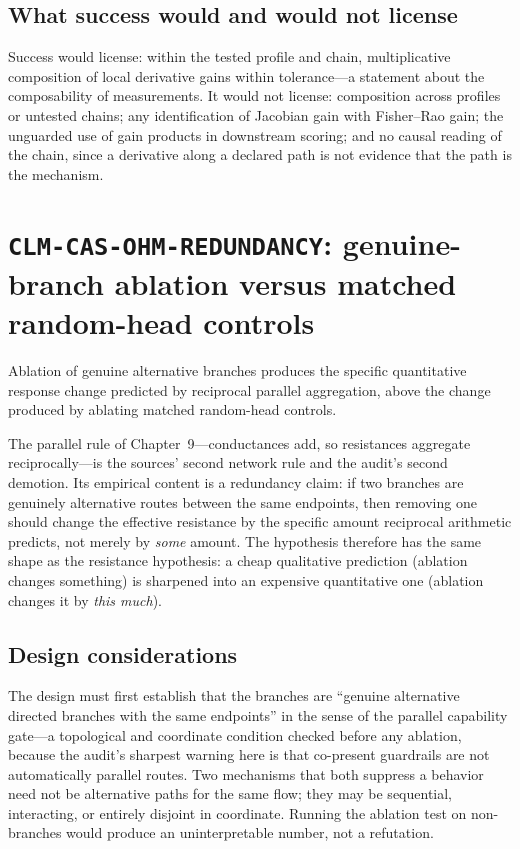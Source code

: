 \subsection{What success would and would not license}

Success would license: within the tested profile and chain, multiplicative composition of local derivative gains within tolerance---a statement about the composability of measurements. It would not license: composition across profiles or untested chains; any identification of Jacobian gain with Fisher--Rao gain; the unguarded use of gain products in downstream scoring; and no causal reading of the chain, since a derivative along a declared path is not evidence that the path is the mechanism.

\section{\texttt{CLM-CAS-OHM-REDUNDANCY}: genuine-branch ablation versus matched random-head controls}\label{hyp:sec:redundancy}

\begin{hypothesis}\label{hyp:hyp:redundancy}
Ablation of genuine alternative branches produces the specific quantitative response change predicted by reciprocal parallel aggregation, above the change produced by ablating matched random-head controls.
\end{hypothesis}

The parallel rule of Chapter~9---conductances add, so resistances aggregate reciprocally---is the sources' second network rule and the audit's second demotion. Its empirical content is a redundancy claim: if two branches are genuinely alternative routes between the same endpoints, then removing one should change the effective resistance by the specific amount reciprocal arithmetic predicts, not merely by \emph{some} amount. The hypothesis therefore has the same shape as the resistance hypothesis: a cheap qualitative prediction (ablation changes something) is sharpened into an expensive quantitative one (ablation changes it by \emph{this much}).

\subsection{Design considerations}

The design must first establish that the branches are ``genuine alternative directed branches with the same endpoints'' in the sense of the parallel capability gate---a topological and coordinate condition checked before any ablation, because the audit's sharpest warning here is that co-present guardrails are not automatically parallel routes. Two mechanisms that both suppress a behavior need not be alternative paths for the same flow; they may be sequential, interacting, or entirely disjoint in coordinate. Running the ablation test on non-branches would produce an uninterpretable number, not a refutation.

